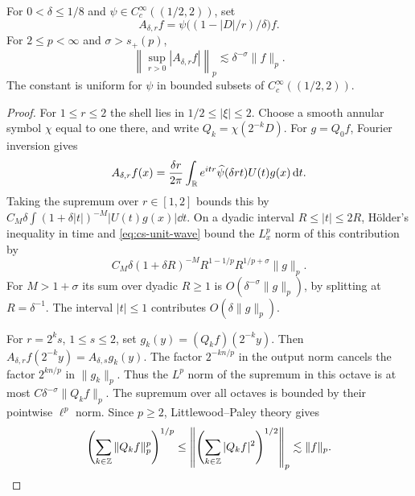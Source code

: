 \begin{lemma}\label{lem:maximal-shell}
For \(0<\delta\le1/8\) and \(\psi\in C_c^\infty((1/2,2))\), set
\[
 A_{\delta,r}f=\psi\big((1-|D|/r)/\delta\big) f .
\]
For \(2\le p<\infty\) and \(\sigma>s_+(p)\),
\[
 \left\|\sup_{r>0}|A_{\delta,r} f|\right\|_p
     \lesssim \delta^{-\sigma}\|f\|_p .
\]
The constant is uniform for \(\psi\) in bounded subsets of
\(C_c^\infty((1/2,2))\).
\end{lemma}

\begin{proof}
For \(1\le r\le2\) the shell lies in \(1/2\le|\xi|\le2\).
Choose a smooth annular symbol \(\chi\) equal to one there, and write
\(Q_k=\chi(2^{-k}D)\). For \(g=Q_0f\), Fourier inversion gives
\[
 A_{\delta,r}f(x)=\frac{\delta r}{2\pi}
     \int_{\mathbb R} e^{itr}\widehat\psi(\delta rt) U(t)g(x)\,\mathrm d t .
\]
Taking the supremum over \(r\in[1,2]\) bounds this by
\(C_M\delta\int (1+\delta |t|)^{-M}|U(t)g(x)|\dd t\).
On a dyadic interval \(R\le |t|\le2R\), H\"older's inequality in time
and \eqref{eq:cs-unit-wave} bound the \(L^p_x\) norm of this contribution by
\[
 C_M\delta(1+\delta R)^{-M}R^{1-1/p}R^{1/p+\sigma}\|g\|_p .
\]
For \(M>1+\sigma\) its sum over dyadic \(R\ge1\) is
\(O(\delta^{-\sigma}\|g\|_p)\), by splitting at \(R=\delta^{-1}\).
The interval \(|t|\le1\) contributes \(O(\delta\|g\|_p)\).

For \(r=2^k s\), \(1\le s\le2\), set \(g_k(y)=(Q_kf)(2^{-k}y)\).
Then \(A_{\delta,r}f(2^{-k}y)=A_{\delta,s}g_k(y)\).
The factor \(2^{-kn/p}\) in the output norm cancels the factor
\(2^{kn/p}\) in \(\|g_k\|_p\). Thus the \(L^p\) norm
of the supremum in this octave is at most \(C\delta^{-\sigma}\|Q_k f\|_p\).
The supremum over all octaves is bounded by their pointwise \(\ell^p\)
norm. Since \(p\ge2\), Littlewood--Paley theory gives
\[
 \left(\sum_{k\in\mathbb Z}\|Q_k f\|_p^p\right)^{1/p}
  \le \left\|\left(\sum_{k\in\mathbb Z}|Q_k f|^2\right)^{1/2}\right\|_p
  \lesssim \|f\|_p .
 \qedhere
\]
\end{proof}

